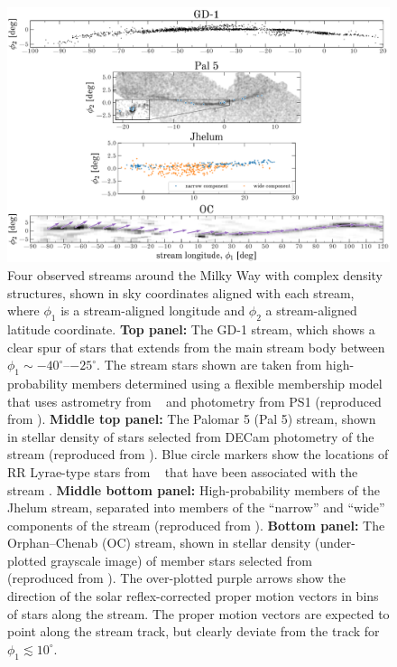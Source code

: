 \documentclass[final,5p,times,twocolumn,authoryear]{elsarticle}
\begin{document}
\begin{figure}[t!]
    \centering
    \includegraphics[width=\textwidth]{figures/stream-density-structure.pdf}
    \caption{
        Four observed streams around the Milky Way with complex density structures,
        shown in sky coordinates aligned with each stream, where $\phi_1$ is a
        stream-aligned longitude and $\phi_2$ a stream-aligned latitude coordinate.
        \textbf{Top panel:} The GD-1 stream, which shows a clear spur of stars that
        extends from the main stream body between $\phi_1 \sim -40^\circ$--$-25^\circ$.
        The stream stars shown are taken from high-probability members determined using
        a flexible membership model that uses astrometry from \gaia\  and
        photometry from PS1 (reproduced from \citealt{tavangar:2024}).
        \textbf{Middle top panel:} The Palomar 5 (Pal 5) stream, shown in stellar
        density of stars selected from DECam photometry of the stream (reproduced from
        \citealt{bonaca:2019}).
        Blue circle markers show the locations of RR Lyrae-type stars from \gaia\ 
        that have been associated with the stream \citep{price-whelan:2019}.
        \textbf{Middle bottom panel:} High-probability members of the Jhelum stream,
        separated into members of the ``narrow'' and ``wide'' components of the stream
        (reproduced from \citealt{awad:2024}).
        \textbf{Bottom panel:} The Orphan--Chenab (OC) stream, shown in stellar density
        (under-plotted grayscale image) of member stars selected from \gaia\ 
        (reproduced from \citealt{koposov:2023}).
        The over-plotted purple arrows show the direction of the solar reflex-corrected
        proper motion vectors in bins of stars along the stream.
        The proper motion vectors are expected to point along the stream track, but
        clearly deviate from the track for $\phi_1 \lesssim 10^\circ$.
    }
    \label{fig:four-obs-streams}
\end{figure}
\end{document}
